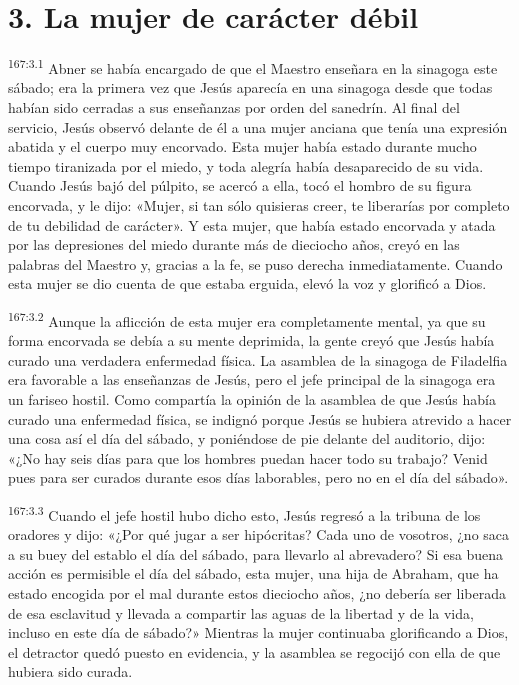 \section*{3. La mujer de carácter débil}
\par 
\textsuperscript{167:3.1} Abner se había encargado de que el Maestro enseñara en la sinagoga este sábado; era la primera vez que Jesús aparecía en una sinagoga desde que todas habían sido cerradas a sus enseñanzas por orden del sanedrín. Al final del servicio, Jesús observó delante de él a una mujer anciana que tenía una expresión abatida y el cuerpo muy encorvado. Esta mujer había estado durante mucho tiempo tiranizada por el miedo, y toda alegría había desaparecido de su vida. Cuando Jesús bajó del púlpito, se acercó a ella, tocó el hombro de su figura encorvada, y le dijo: «Mujer, si tan sólo quisieras creer, te liberarías por completo de tu debilidad de carácter». Y esta mujer, que había estado encorvada y atada por las depresiones del miedo durante más de dieciocho años, creyó en las palabras del Maestro y, gracias a la fe, se puso derecha inmediatamente. Cuando esta mujer se dio cuenta de que estaba erguida, elevó la voz y glorificó a Dios.

\par 
\textsuperscript{167:3.2} Aunque la aflicción de esta mujer era completamente mental, ya que su forma encorvada se debía a su mente deprimida, la gente creyó que Jesús había curado una verdadera enfermedad física. La asamblea de la sinagoga de Filadelfia era favorable a las enseñanzas de Jesús, pero el jefe principal de la sinagoga era un fariseo hostil. Como compartía la opinión de la asamblea de que Jesús había curado una enfermedad física, se indignó porque Jesús se hubiera atrevido a hacer una cosa así el día del sábado, y poniéndose de pie delante del auditorio, dijo: «¿No hay seis días para que los hombres puedan hacer todo su trabajo? Venid pues para ser curados durante esos días laborables, pero no en el día del sábado».

\par 
\textsuperscript{167:3.3} Cuando el jefe hostil hubo dicho esto, Jesús regresó a la tribuna de los oradores y dijo: «¿Por qué jugar a ser hipócritas? Cada uno de vosotros, ¿no saca a su buey del establo el día del sábado, para llevarlo al abrevadero? Si esa buena acción es permisible el día del sábado, esta mujer, una hija de Abraham, que ha estado encogida por el mal durante estos dieciocho años, ¿no debería ser liberada de esa esclavitud y llevada a compartir las aguas de la libertad y de la vida, incluso en este día de sábado?» Mientras la mujer continuaba glorificando a Dios, el detractor quedó puesto en evidencia, y la asamblea se regocijó con ella de que hubiera sido curada.

